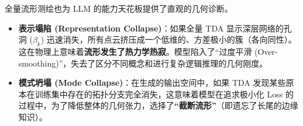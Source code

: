 
全量流形测绘也为 LLM 的能力天花板提供了直观的几何诊断。

\begin{itemize}
    \item   \textbf{表示塌陷 (Representation Collapse)}：如果全量 TDA 显示深层网络的孔洞 ($\beta_k$) 迅速消失，所有点云挤压成一个低维的、方差极小的簇（各向同性）。这在物理上意味着\textbf{流形发生了热力学热寂}。模型陷入了“过度平滑 (Over-smoothing)”，失去了区分不同概念和进行复杂逻辑推理的几何刚度。
    \item   \textbf{模式坍塌 (Mode Collapse)}：在生成的输出空间中，如果 TDA 发现某些原本在训练集中存在的拓扑分支完全消失，这意味着模型在追求极小化 Loss 的过程中，为了降低整体的几何张力，选择了\textbf{“截断流形”}（即遗忘了长尾的边缘知识）。
\end{itemize}


